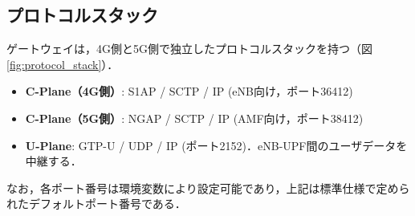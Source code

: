 \subsection{プロトコルスタック}
\label{subsec:protocol_stack}

ゲートウェイは，4G側と5G側で独立したプロトコルスタックを持つ（図\ref{fig:protocol_stack}）．
\begin{itemize}
\item \textbf{C-Plane（4G側）}: S1AP / SCTP / IP (eNB向け，ポート36412)
\item \textbf{C-Plane（5G側）}: NGAP / SCTP / IP (AMF向け，ポート38412)
\item \textbf{U-Plane}: GTP-U / UDP / IP (ポート2152)．eNB-UPF間のユーザデータを中継する．
\end{itemize}
なお，各ポート番号は環境変数により設定可能であり，上記は標準仕様で定められたデフォルトポート番号である．

